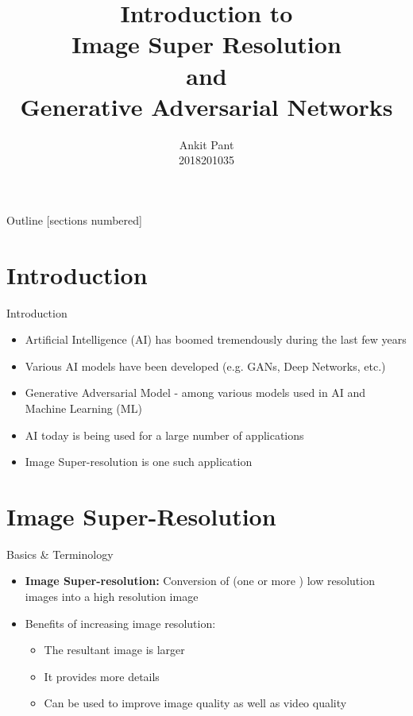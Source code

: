 \documentclass{beamer}
\title{\centering Introduction to \\ Image Super Resolution \\ and \\ Generative Adversarial Networks \\}
\author{Ankit Pant \\ 2018201035}
\date{}
\begin{document}
\begin{frame}[plain]
    \maketitle
\end{frame}
\begin{frame}{Outline}
	[sections numbered]
	\tableofcontents
\end{frame}

\section{Introduction}
	\begin{frame}{Introduction}
		\begin{itemize}
			\item Artificial Intelligence (AI) has boomed tremendously during the last few years
			\item Various AI models have been developed (e.g. GANs, Deep Networks, etc.)
			\item Generative Adversarial Model - among various models used in AI and Machine Learning (ML)
			\item AI today is being used for a large number of applications
			\item  Image Super-resolution is one such application
		\end{itemize}
	\end{frame}

\section{Image Super-Resolution}
	\begin{frame}{Basics \& Terminology }
		\begin{itemize}
			\item 	\textbf{Image Super-resolution:} Conversion of (one or more ) low resolution images into a high resolution image 
			\item Benefits of increasing image resolution:
			\begin{itemize}
				\item The resultant image is larger
				\item It provides more details
				\item Can be used to improve image quality as well as video quality
			\end{itemize}
		\end{itemize}
	\end{frame}
	
\end{document}
